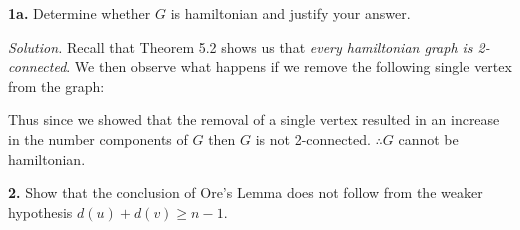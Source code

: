 \documentclass{article}
\begin{document}
\setlength{\parindent}{0cm}   %






\textbf{1a.} Determine whether \(G\) is hamiltonian and justify your answer. 


\vspace{3mm}
\textit{Solution.}  Recall that Theorem 5.2 shows us that \textit{every hamiltonian graph is 2-connected}. We then observe what happens if we remove the following single vertex from the graph:


\begin{center}
\hspace{2cm}
\end{center}
Thus since we showed that the removal of a single vertex resulted in an increase in the number components of \(G\) then \(G\) is not 2-connected. \(\therefore G\) cannot be hamiltonian. 




\vspace{6mm}

\textbf{2.} Show that the conclusion of Ore's Lemma does not follow from the weaker hypothesis \(d(u)+d(v) \geq n-1\). 
\end{document}
